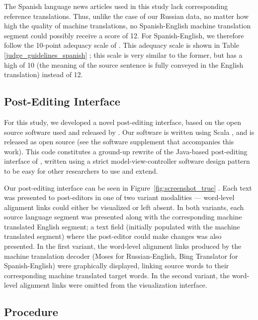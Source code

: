 The Spanish language news articles used in this study lack corresponding reference translations.
%
Thus, unlike the case of our Russian data, no matter how high the quality of machine translations, no Spanish-English machine translation segment could possibly receive a score of 12.
%
For Spanish-English, we therefore follow the 10-point adequacy scale of \citet{2009_EACL_Albrecht_etal}.
%
This adequacy scale is shown in Table \ref{judge_guidelines_spanish} ;
%
this scale is very similar to the former, but has a high of 10 (the meaning of the source sentence is fully conveyed in the English translation) instead of 12.





\subsection{Post-Editing Interface}

For this study, we developed a novel post-editing interface, based on the open source software used and released by \citet{2014_WMT_Schwartz_etal}.
%
Our software is written using Scala \citep{2014_Scala_Odersky}, and is released as open source (see the software supplement that accompanies this work).
%
This code constitutes a ground-up rewrite of the Java-based post-editing interface of \citet{2014_WMT_Schwartz_etal}, written using a strict model-view-controller software design pattern to be easy for other researchers to use and extend.

Our post-editing interface can be seen in Figure~\ref{fig:screenshot_true} .
%
Each text was presented to post-editors in one of two variant modalities --- word-level alignment links could either be visualized or left absent.
%
In both variants, each source language segment was presented along with the corresponding machine translated English segment; a text field (initially populated with the machine translated segment) where the post-editor could make changes was also presented.
%
In the first variant, the word-level alignment links produced by the machine translation decoder (Moses for Russian-English, Bing Translator for Spanish-English) were graphically displayed, linking source words to their corresponding machine translated target words.
%
In the second variant, the word-level alignment links were omitted from the visualization interface.


  
 \subsection{Procedure}

